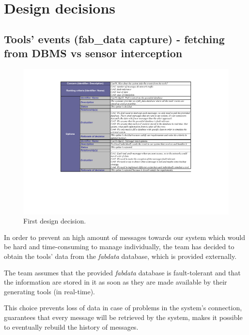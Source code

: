 \section{Design decisions}


\subsection{Tools' events (fab\_data capture) - fetching from DBMS vs sensor interception}
\label{first_design_decision}
  
    \begin{figure}[H]
\centering
 \includegraphics[trim=5cm 5.5cm 5cm 1cm,clip=true, width=\textwidth]{dd/dd1.pdf}
\caption{First design decision.}
\end{figure}
In order to prevent an high amount of messages towards our system which would be hard and time-consuming to manage individually, the team has decided to obtain the tools’ data from the \textit{fab\textunderscore data} database, which is provided externally.

The team assumes that the provided \textit{fab\textunderscore data} database is fault-tolerant and that the information are stored in it as soon as they are made available by their generating tools (in real-time).

This choice prevents loss of data in case of problems in the system’s connection, guarantees that every message will be retrieved by the system, makes it possible to eventually rebuild the history of messages.

\newpage
